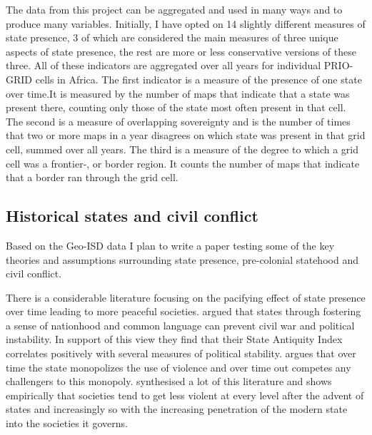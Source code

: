 \documentclass[12pt]{article}
\begin{document}
The data from this project can be aggregated and used in many ways and to
produce many variables. Initially, I have opted on 14 slightly different
measures of state presence, 3 of which are considered the main measures of three
unique aspects of state presence, the rest are more or less conservative
versions of these three. All of these indicators are aggregated over all years
for individual PRIO-GRID cells in Africa. The first indicator is a measure of
the presence of one state over time.It is measured by the number of maps that
indicate that a state was present there, counting only those of the state most
often present in that cell. The second is a measure of overlapping sovereignty
and is the number of times that two or more maps in a year disagrees on which
state was present in that grid cell, summed over all years.  The third is a
measure of the degree to which a grid cell was a frontier-, or border region. It
counts the number of maps that indicate that a border ran through the grid cell.

\subsection{Historical states and civil conflict}

Based on the Geo-ISD data I plan to write a paper testing some of the key
theories and assumptions surrounding state presence, pre-colonial statehood and
civil conflict.

There is a considerable literature focusing on the pacifying effect of state
presence over time leading to more peaceful societies. \citet{Bockstette2002}
argued that states through fostering a sense of nationhood and common language
can prevent civil war and political instability. In support of this view they
find that their State Antiquity Index correlates positively with several
measures of political stability. \citet{Tilly1990} argues that over time the
state monopolizes the use of violence and over time out competes any challengers
to this monopoly. \citet{Pinker2012} synthesised a lot of this literature and
shows empirically that societies tend to get less violent at every level after
the advent of states and increasingly so with the increasing penetration of the
modern state into the societies it governs.
\end{document}
